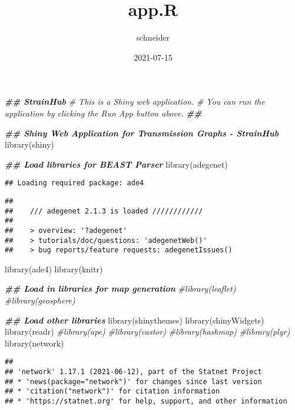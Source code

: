 \documentclass[
]{article}
\title{app.R}
\author{schneider}
\date{2021-07-15}
\newenvironment{Shaded}{\begin{snugshade}}{\end{snugshade}}
\newcommand{\CommentTok}[1]{\textcolor[rgb]{0.56,0.35,0.01}{\textit{#1}}}
\newcommand{\DocumentationTok}[1]{\textcolor[rgb]{0.56,0.35,0.01}{\textbf{\textit{#1}}}}
\newcommand{\FunctionTok}[1]{\textcolor[rgb]{0.00,0.00,0.00}{#1}}
\newcommand{\NormalTok}[1]{#1}
\begin{document}
\maketitle

\begin{Shaded}
\begin{Highlighting}[]
\DocumentationTok{\#\# StrainHub}
\CommentTok{\# This is a Shiny web application.}
\CommentTok{\# You can run the application by clicking the \textquotesingle{}Run App\textquotesingle{} button above.}
\DocumentationTok{\#\#}

\DocumentationTok{\#\# Shiny Web Application for Transmission Graphs {-} StrainHub}
\FunctionTok{library}\NormalTok{(shiny)}

\DocumentationTok{\#\# Load libraries for BEAST Parser}
\FunctionTok{library}\NormalTok{(adegenet)}
\end{Highlighting}
\end{Shaded}

\begin{verbatim}
## Loading required package: ade4
\end{verbatim}

\begin{verbatim}
## 
##    /// adegenet 2.1.3 is loaded ////////////
## 
##    > overview: '?adegenet'
##    > tutorials/doc/questions: 'adegenetWeb()' 
##    > bug reports/feature requests: adegenetIssues()
\end{verbatim}

\begin{Shaded}
\begin{Highlighting}[]
\FunctionTok{library}\NormalTok{(ade4)}
\FunctionTok{library}\NormalTok{(knitr)}

\DocumentationTok{\#\# Load in libraries for map generation}
\CommentTok{\#library(leaflet)}
\CommentTok{\#library(geosphere)}

\DocumentationTok{\#\# Load other libraries}
\FunctionTok{library}\NormalTok{(shinythemes)}
\FunctionTok{library}\NormalTok{(shinyWidgets)}
\FunctionTok{library}\NormalTok{(readr)}
\CommentTok{\#library(ape)}
\CommentTok{\#library(castor)}
\CommentTok{\#library(hashmap)}
\CommentTok{\#library(plyr)}
\FunctionTok{library}\NormalTok{(network)}
\end{Highlighting}
\end{Shaded}

\begin{verbatim}
## 
## 'network' 1.17.1 (2021-06-12), part of the Statnet Project
## * 'news(package="network")' for changes since last version
## * 'citation("network")' for citation information
## * 'https://statnet.org' for help, support, and other information
\end{verbatim}
\end{document}
